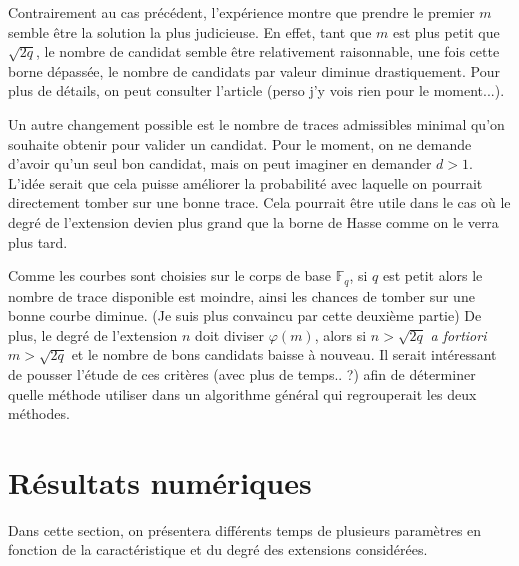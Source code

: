 \documentclass[a4paper]{article} %
\numberwithin{section}{part}
\numberwithin{equation}{section}
\newcommand\GF[1]{\mathbb{F}_{#1}}
\begin{document}
\begin{rem}
Contrairement au cas précédent, l'expérience montre que prendre le premier $m$ 
semble être la solution la plus judicieuse. En effet, tant que $m$ est plus 
petit que $\sqrt{2q}$, le nombre de candidat semble être relativement 
raisonnable, une fois cette borne dépassée, le nombre de candidats par valeur 
diminue drastiquement. Pour plus de détails, on peut consulter l'article 
\cite{CasHen} (perso j'y vois rien pour le moment...).\par
Un autre changement possible est le nombre de traces admissibles minimal qu'on
souhaite obtenir pour valider un candidat. Pour le moment, on ne demande d'avoir
qu'un seul bon candidat, mais on peut imaginer en demander $d>1$. 
L'idée serait que cela puisse améliorer la probabilité avec laquelle on pourrait
directement tomber sur une bonne trace. Cela pourrait être utile dans le cas où
le degré de l'extension devien plus grand que la borne de Hasse comme on le
verra plus tard.\par
Comme les courbes sont choisies sur le corps de base $\GF{q}$, si $q$ est petit
alors le nombre de trace disponible est moindre, ainsi les chances de tomber sur
une bonne courbe diminue. (Je suis plus convaincu par cette deuxième partie) 
De plus, le degré de l'extension $n$ doit diviser $\varphi(m)$, alors si $n > 
\sqrt{2q}$ \emph{a fortiori} $m >\sqrt{2q}$ et le nombre de bons candidats 
baisse à nouveau. Il serait intéressant de pousser l'étude de ces critères 
(avec plus de temps.. ?) afin de déterminer quelle méthode utiliser dans un 
algorithme général qui regrouperait les deux méthodes.
\end{rem}

\section{Résultats numériques}
%
%
%
%
Dans cette section, on présentera différents temps de plusieurs paramètres en
fonction de la caractéristique et du degré des extensions considérées.
\end{document}
